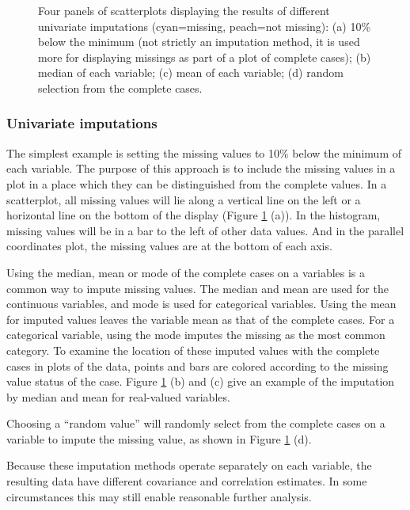 \documentclass[english]{article}
\begin{document}
\begin{center}
\begin{figure}[h]
\caption{\label{fig:univariate-imputation}Four panels of scatterplots displaying the results of different univariate imputations (cyan=missing, peach=not missing): (a) 10\% below the minimum (not strictly an imputation method, it is used more for displaying missings as part of a plot of complete cases); (b) median of each variable; (c) mean of each variable; (d) random selection from the complete cases. }

\end{figure}
\par\end{center}

\subsubsection{Univariate imputations}

The simplest example is setting the missing values to 10\% below the minimum of each variable. The purpose of this approach is to include the missing values in a plot in a place which they can be distinguished from the complete values. In a scatterplot, all missing values will lie along a vertical line on the left or a horizontal line on the bottom of the display (Figure \ref{fig:univariate-imputation} (a)). In the histogram, missing values will be in a bar to the left of other data values. And in the parallel coordinates plot, the missing values are at the bottom of each axis.

Using the median, mean or mode of the complete cases on a variables is a common way to impute missing values. The median and mean are used for the continuous variables, and mode is used for categorical variables. Using the mean for imputed values  leaves the variable mean as that of the complete cases. For a categorical variable, using the mode imputes the missing as the most common category. To examine the location of these imputed values with the complete cases in plots of the data, points and bars are colored according to the missing value status of the case. Figure \ref{fig:univariate-imputation} (b) and (c) give an example of the imputation by median and mean for real-valued variables.

Choosing a ``random value''  will randomly select from the complete cases on a variable to impute the missing value, as shown in Figure \ref{fig:univariate-imputation} (d).

Because these imputation methods operate separately on each variable, the resulting data have different covariance and correlation estimates. In some circumstances this may still enable reasonable further analysis.
\end{document}
